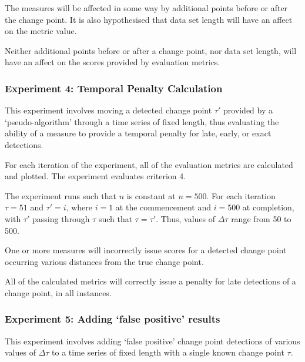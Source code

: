 \documentclass[../main.tex]{subfiles}
\begin{document}
\begin{hypothesis}
    The measures will be affected in some way by additional points before or after the change point. It is also hypothesised that data set length will have an affect on the metric value.
\end{hypothesis}

\begin{nullhypothesis}
    Neither additional points before or after a change point, nor data set length, will have an affect on the scores provided by evaluation metrics.
\end{nullhypothesis}

\subsubsection{Experiment 4: Temporal Penalty Calculation}

This experiment involves moving a detected change point $\tau'$ provided by a `pseudo-algorithm' through a time series of fixed length, thus evaluating the ability of a measure to provide a temporal penalty for late, early, or exact detections.

For each iteration of the experiment, all of the evaluation metrics are calculated and plotted. The experiment evaluates criterion 4.

The experiment runs such that $n$ is constant at $n=500$. For each iteration $\tau = 51$ and $\tau' = i$, where $i = 1$ at the commencement and $i = 500$ at completion, with $\tau'$ passing through $\tau$ such that $\tau = \tau'$. Thus, values of $\Delta \tau$ range from 50 to 500.

\begin{hypothesis}
    One or more measures will incorrectly issue scores for a detected change point occurring various distances from the true change point.
\end{hypothesis}

\begin{nullhypothesis}
    All of the calculated metrics will correctly issue a penalty for late detections of a change point, in all instances.
\end{nullhypothesis}

\subsubsection{Experiment 5: Adding `false positive' results}

This experiment involves adding `false positive' change point detections of various values of $\Delta \tau$ to a time series of fixed length with a single known change point $\tau$.
\end{document}
